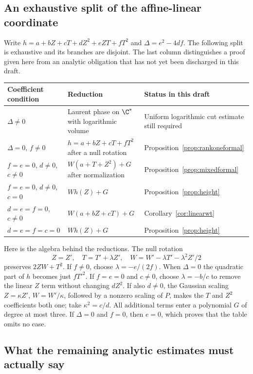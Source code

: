 \subsection{An exhaustive split of the affine-linear coordinate}\label{sec:wsplit}

Write $h=a+bZ+cT+dZ^2+eZT+fT^2$ and
$\Delta=e^2-4df$. The following split is exhaustive and its branches
are disjoint. The last column distinguishes a proof given here from
an analytic obligation that has not yet been discharged in this draft.

\begin{center}\small
\begin{tabular}{@{}p{}p{}p{}@{}}
\toprule
Coefficient condition & Reduction & Status in this draft\\
\midrule
$\Delta\ne0$ & Laurent phase on $\C^*$ with logarithmic volume &
Uniform logarithmic cut estimate still required\\[3pt]
$\Delta=0$, $f\ne0$ & $h=a+bZ+cT+fT^2$ after a null rotation &
Proposition~\ref{prop:rankoneformal}\\[3pt]
$f=e=0$, $d\ne0$, $c\ne0$ &
$W(a+T+Z^2)+G$ after normalization &
Proposition~\ref{prop:mixedformal}\\[3pt]
$f=e=0$, $d\ne0$, $c=0$ & $Wh(Z)+G$ &
Proposition~\ref{prop:height}\\[3pt]
$d=e=f=0$, $c\ne0$ & $W(a+bZ+cT)+G$ &
Corollary~\ref{cor:linearwt}\\[3pt]
$d=e=f=c=0$ & $Wh(Z)+G$ &
Proposition~\ref{prop:height}\\
\bottomrule
\end{tabular}
\end{center}

Here is the algebra behind the reductions. The null rotation
\[
 Z=Z',\quad T=T'+\lambda Z',\quad
 W=W'-\lambda T'-\lambda^2Z'/2
\]
preserves $2ZW+T^2$. If $f\ne0$, choose $\lambda=-e/(2f)$.
When $\Delta=0$ the quadratic part of $h$ becomes just $fT'^2$.
If $f=e=0$ and $c\ne0$, choose $\lambda=-b/c$ to remove the
linear $Z$ term without changing $dZ^2$. If also $d\ne0$, the
Gaussian scaling $Z=\kappa Z'$, $W=W'/\kappa$, followed by a
nonzero scaling of $P$, makes the $T$ and $Z^2$ coefficients both
one; take $\kappa^2=c/d$. All additional terms enter a polynomial
$G$ of degree at most three. If $\Delta=0$ and $f=0$, then $e=0$,
which proves that the table omits no case.

\subsection{What the remaining analytic estimates must actually say}
\label{sec:analyticgates}

